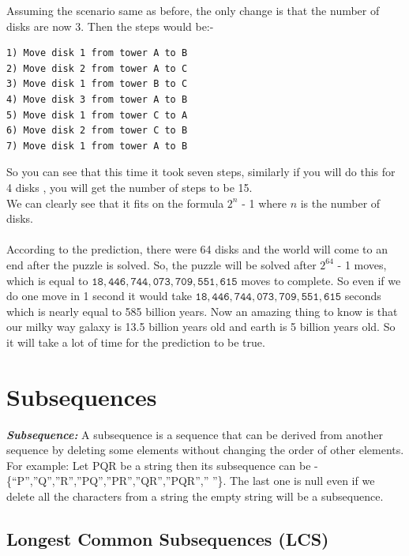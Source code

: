 \documentclass[12pt]{book}
\begin{document}
Assuming the scenario same as before, the only change is that the number of disks are now 3. Then the steps would be:-\\
\begin{lstlisting}
1) Move disk 1 from tower A to B
2) Move disk 2 from tower A to C
3) Move disk 1 from tower B to C
4) Move disk 3 from tower A to B
5) Move disk 1 from tower C to A
6) Move disk 2 from tower C to B
7) Move disk 1 from tower A to B
\end{lstlisting}
So you can see that this time it took seven steps, similarly if you will do this for 4 disks , you will get the number of steps to be 15.\\
We can clearly see that it fits on the formula $2^n$ - 1 where $n$ is the number of disks.\\\\
According to the prediction, there were 64 disks and the world will come to an end after the puzzle is solved. So, the puzzle will be solved after $2^{64}$ - 1 moves, which is equal to $\mathtt{18,446,744,073,709,551,615}$ moves to complete. So even if we do one move in 1 second it would take  $\mathtt{18,446,744,073,709,551,615}$ seconds which is nearly equal to 585 billion years. 
Now an amazing thing to know is that our milky way galaxy is 13.5 billion years old and earth is 5 billion years old. So it will take a lot of time for the prediction to be true.\\

\chapter{Subsequences}

\textbf{\textit{Subsequence:}} A subsequence is a sequence that can be derived from another sequence by deleting some elements without changing the order of other elements.\newline
For example: Let PQR be a string then its subsequence can be -\newline \{“P”,”Q”,”R”,”PQ”,”PR”,”QR”,”PQR”,” ”\}. The last one is null even if we delete all the characters from a string the empty string will be a subsequence.\newline

\section{Longest Common Subsequences (LCS)}
\end{document}
